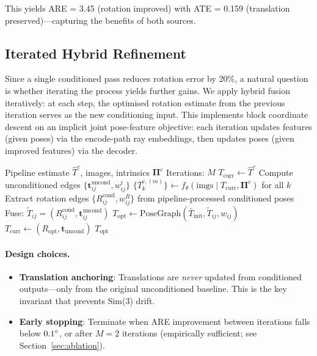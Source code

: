 This yields ARE = 3.45\degree{} (rotation improved) with ATE = 0.159 (translation preserved)---capturing the benefits of both sources.

\subsection{Iterated Hybrid Refinement}
\label{sec:iteration}

Since a single conditioned pass reduces rotation error by 20\%, a natural question is whether iterating the process yields further gains. We apply hybrid fusion iteratively: at each step, the optimised rotation estimate from the previous iteration serves as the new conditioning input. This implements block coordinate descent on an implicit joint pose-feature objective: each iteration updates features (given poses) via the encode-path ray embeddings, then updates poses (given improved features) via the decoder.

\begin{algorithm}[t]
\caption{Iterated Hybrid Refinement}
\label{alg:itermc}
\begin{algorithmic}[1]
\REQUIRE Pipeline estimate $\hat{T}^c$, images, intrinsics $\boldsymbol{\Pi}^c$
\REQUIRE Iterations: $M$
\STATE $T_{\text{curr}} \leftarrow \hat{T}^c$
\STATE Compute unconditioned edges $\{\mathbf{t}_{ij}^{\text{uncond}}, w_{ij}^t\}$ 
    \STATE $\{T_{k}^{c,(m)}\} \leftarrow f_\theta(\text{imgs} \mid T_{\text{curr}}, \boldsymbol{\Pi}^c)$ for all $k$
    \STATE Extract rotation edges $\{R_{ij}^{\text{cond}}, w_{ij}^R\}$ from pipeline-processed conditioned poses
    \STATE Fuse: $\tilde{T}_{ij} = (R_{ij}^{\text{cond}}, \mathbf{t}_{ij}^{\text{uncond}})$
    \STATE $T_{\text{opt}} \leftarrow \text{PoseGraph}(\bar{T}_{\text{init}}, \tilde{T}_{ij}, w_{ij})$
    \STATE $T_{\text{curr}} \leftarrow (R_{\text{opt}}, \mathbf{t}_{\text{uncond}})$ 
\ENDFOR
\RETURN $T_{\text{opt}}$
\end{algorithmic}
\end{algorithm}

\paragraph{Design choices.}
\begin{itemize}
    \item \textbf{Translation anchoring}: Translations are \emph{never} updated from conditioned outputs---only from the original unconditioned baseline. This is the key invariant that prevents Sim(3) drift.
    \item \textbf{Early stopping}: Terminate when ARE improvement between iterations falls below $0.1\degree$, or after $M=2$ iterations (empirically sufficient; see Section~\ref{sec:ablation}).
\end{itemize}

